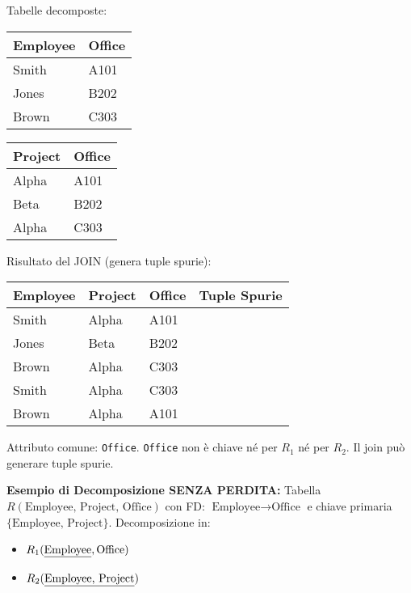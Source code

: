 	\noindent Tabelle decomposte:
	\begin{center}
	\begin{tabular}{|l|l|}
		\hline
		\textbf{Employee} & \textbf{Office} \\ \hline
		Smith & A101 \\ \hline
		Jones & B202 \\ \hline
		Brown & C303 \\ \hline
	\end{tabular}
	\quad
	\begin{tabular}{|l|l|}
		\hline
		\textbf{Project} & \textbf{Office} \\ \hline
		Alpha & A101 \\ \hline
		Beta & B202 \\ \hline
		Alpha & C303 \\ \hline
	\end{tabular}
	\end{center}

	\noindent Risultato del JOIN (genera tuple spurie):
	\begin{center}
	\begin{tabular}{|l|l|l|c|}
		\hline
		\textbf{Employee} & \textbf{Project} & \textbf{Office} & \textbf{Tuple Spurie} \\ \hline
		Smith & Alpha & A101 & \\ \hline
		Jones & Beta & B202 & \\ \hline
		Brown & Alpha & C303 & \\ \hline
		Smith & Alpha & C303 & \checkmark \\ \hline
		Brown & Alpha & A101 & \checkmark \\ \hline
	\end{tabular}
	\end{center}
	
	\noindent Attributo comune: \texttt{Office}. \texttt{Office} non è chiave né per $R_1$ né per $R_2$. Il join può generare tuple spurie.
	
	\textbf{Esempio di Decomposizione SENZA PERDITA:}
	Tabella $R(\text{Employee, Project, Office})$ con FD: $\text{Employee} \rightarrow \text{Office}$ e chiave primaria $\{\text{Employee, Project}\}$.
	Decomposizione in:
	\begin{itemize}
		\item $R_1(\text{\underline{Employee}}, \text{Office})$
		\item $R_2(\text{\underline{Employee, Project}})$
	\end{itemize}
	
